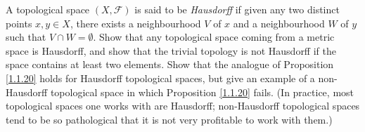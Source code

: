 \begin{exercise}\label{ex 2.5.4}
    A topological space \((X, \mathcal{F})\) is said to be \emph{Hausdorff} if given any two distinct points \(x, y \in X\), there exists a neighbourhood \(V\) of \(x\) and a neighbourhood \(W\) of \(y\) such that \(V \cap W = \emptyset\).
    Show that any topological space coming from a metric space is Hausdorff, and show that the trivial topology is not Hausdorff if the space contains at least two elements.
    Show that the analogue of Proposition \ref{1.1.20} holds for Hausdorff topological spaces, but give an example of a non-Hausdorff topological space in which Proposition \ref{1.1.20} fails.
    (In practice, most topological spaces one works with are Hausdorff;
    non-Hausdorff topological spaces tend to be so pathological that it is not very profitable to work with them.)
\end{exercise}


